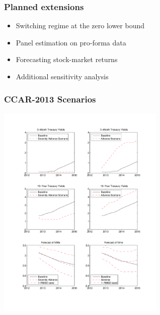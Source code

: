 \documentclass[handout]{beamer}
\begin{document}

\begin{frame}
\frametitle{Planned extensions}
\begin{itemize}
\item \vspace{0.0in} Switching regime at the zero lower bound
\item \vspace{0.0in} Panel estimation on pro-forma data
\item \vspace{0.0in} Forecasting stock-market returns
\item \vspace{0.0in} Additional sensitivity analysis
\end{itemize}
\end{frame}

\begin{frame}
\frametitle{CCAR-2013 Scenarios}
\vspace{-0.4in}
\hspace{0.65in}\includegraphics[height=10.4cm,width=8cm]{figure_ccar_2013.pdf}

\end{frame}
\end{document}
